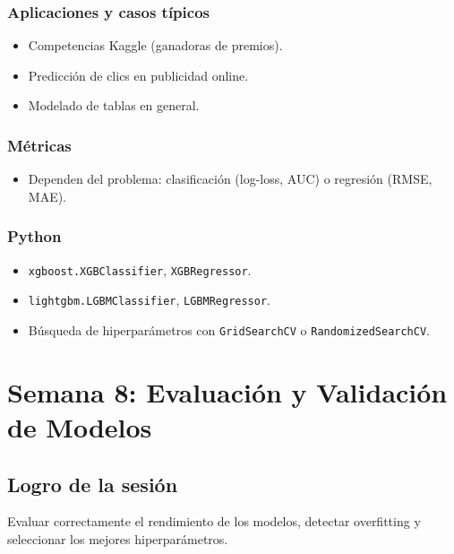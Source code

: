 \documentclass[12pt,a4paper,openany,oneside]{book}
\begin{document}
\subsection{Aplicaciones y casos típicos}
\begin{itemize}
    \item Competencias Kaggle (ganadoras de premios).
    \item Predicción de clics en publicidad online.
    \item Modelado de tablas en general.
\end{itemize}

\subsection{Métricas}
\begin{itemize}
    \item Dependen del problema: clasificación (log-loss, AUC) o regresión (RMSE, MAE).
\end{itemize}

\subsection{Python}
\begin{itemize}
    \item \texttt{xgboost.XGBClassifier}, \texttt{XGBRegressor}.
    \item \texttt{lightgbm.LGBMClassifier}, \texttt{LGBMRegressor}.
    \item Búsqueda de hiperparámetros con \texttt{GridSearchCV} o \texttt{RandomizedSearchCV}.
\end{itemize}

\chapter{Semana 8: Evaluación y Validación de Modelos}

\section{Logro de la sesión}
Evaluar correctamente el rendimiento de los modelos, detectar overfitting y seleccionar los mejores hiperparámetros.
\end{document}
